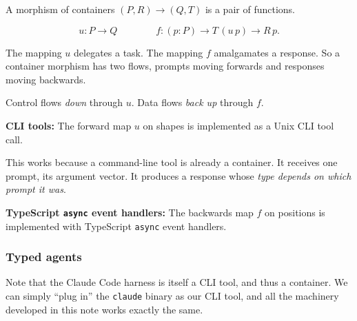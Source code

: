 \documentclass[aspectratio=169,12pt]{beamer}
\begin{document}
\begin{frame}
\vfill
\begin{center}
\begin{minipage}{0.92\textwidth}
\raggedright
\large

A morphism of containers $(P, R) \to (Q, T)$ is a pair of functions.

\medskip

\[
u : P \to Q
\qquad\qquad
f : (p : P) \to T\,(u\,p) \to R\,p.
\]

\medskip

The mapping $u$ delegates a task. The mapping $f$ amalgamates a response. So a container morphism
has two flows, prompts moving forwards and responses moving backwards.

\medskip

Control flows \emph{down} through $u$. Data flows \emph{back up} through $f$.

\end{minipage}
\end{center}
\vfill
\end{frame}

\begin{frame}
\vfill
\begin{center}
\begin{minipage}{0.92\textwidth}
\raggedright
\large

\textbf{CLI tools:} The forward map $u$ on shapes is implemented as a Unix CLI tool call.

\medskip

This works because a command-line tool is already a container. It receives one prompt, its
argument vector. It produces a response whose \emph{type depends on which prompt it was}.

\bigskip

\textbf{TypeScript \texttt{async} event handlers:} The backwards map $f$ on positions is
implemented with TypeScript \texttt{async} event handlers.

\end{minipage}
\end{center}
\vfill
\end{frame}

\begin{frame}
\frametitle{Typed agents}
\vfill
\begin{center}
\begin{minipage}{0.92\textwidth}
\raggedright
\large

Note that the Claude Code harness is itself a CLI tool, and thus a container. We can simply
``plug in'' the \texttt{claude} binary as our CLI tool, and all the machinery developed in this
note works exactly the same.

\end{minipage}
\end{center}
\vfill
\end{frame}
\end{document}
